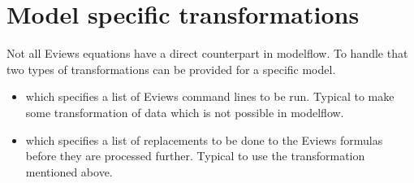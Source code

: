 \documentclass[letterpaper,10pt,english]{jupyterBook}
\begin{document}
\section{Model specific transformations}
\label{\detokenize{content/howto/onboard/eviews/onboard one model from  wf1:model-specific-transformations}}
\sphinxAtStartPar
Not all Eviews equations have a direct counterpart in modelflow.
To handle that two types of transformations can be provided for a specific model.
\begin{itemize}
\item {} 
\sphinxAtStartPar
{} which specifies a list of Eviews command lines to be run. Typical to make some transformation of data which is not possible in modelflow.

\item {} 
\sphinxAtStartPar
{} which specifies a list of replacements to be done to the Eviews formulas before they are processed further. Typical to use the transformation mentioned above.

\end{itemize}
\end{document}
